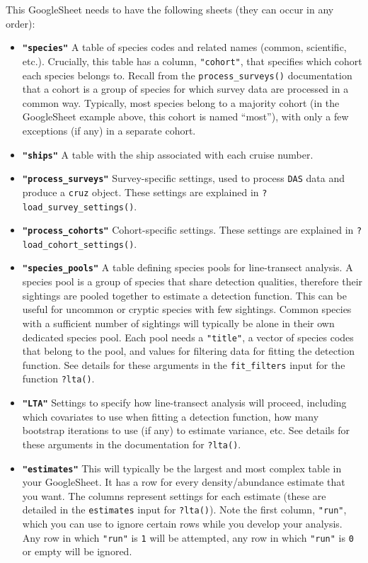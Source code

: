 \documentclass[
]{book}
\begin{document}
This GoogleSheet needs to have the following sheets (they can occur in any order):

\begin{itemize}
\item
  \textbf{\texttt{"species"}} A table of species codes and related names (common, scientific, etc.).
  Crucially, this table has a column, \texttt{"cohort"}, that specifies which cohort each species belongs to.
  Recall from the \texttt{process\_surveys()} documentation that a cohort is a group of species
  for which survey data are processed in a common way. Typically, most species belong
  to a majority cohort (in the GoogleSheet example above, this cohort is named ``most''),
  with only a few exceptions (if any) in a separate cohort.
\item
  \textbf{\texttt{"ships"}} A table with the ship associated with each cruise number.
\item
  \textbf{\texttt{"process\_surveys"}} Survey-specific settings, used to process \texttt{DAS} data and produce a \texttt{cruz} object. These settings are explained in \texttt{?load\_survey\_settings()}.
\item
  \textbf{\texttt{"process\_cohorts"}} Cohort-specific settings. These settings are explained in \texttt{?load\_cohort\_settings()}.
\item
  \textbf{\texttt{"species\_pools"}} A table defining species pools for line-transect analysis.
  A species pool is a group of species that share detection qualities, therefore their
  sightings are pooled together to estimate a detection function. This can be useful for
  uncommon or cryptic species with few sightings. Common species with a sufficient number
  of sightings will typically be alone in their own dedicated species pool.
  Each pool needs a \texttt{"title"}, a vector of species codes that belong to the pool, and
  values for filtering data for fitting the detection function. See details for
  these arguments in the \texttt{fit\_filters} input for the function \texttt{?lta()}.
\item
  \textbf{\texttt{"LTA"}} Settings to specify how line-transect analysis will proceed,
  including which covariates to use when fitting a detection function,
  how many bootstrap iterations to use (if any) to estimate variance, etc.
  See details for these arguments in the documentation for \texttt{?lta()}.
\item
  \textbf{\texttt{"estimates"}} This will typically be the largest and most complex table
  in your GoogleSheet. It has a row for every density/abundance estimate that you want.
  The columns represent settings for each estimate (these are detailed in the
  \texttt{estimates} input for \texttt{?lta()}). Note the first column, \texttt{"run"}, which you can
  use to ignore certain rows while you develop your analysis. Any row in which \texttt{"run"} is \texttt{1} will
  be attempted, any row in which \texttt{"run"} is \texttt{0} or empty will be ignored.
\end{itemize}
\end{document}
